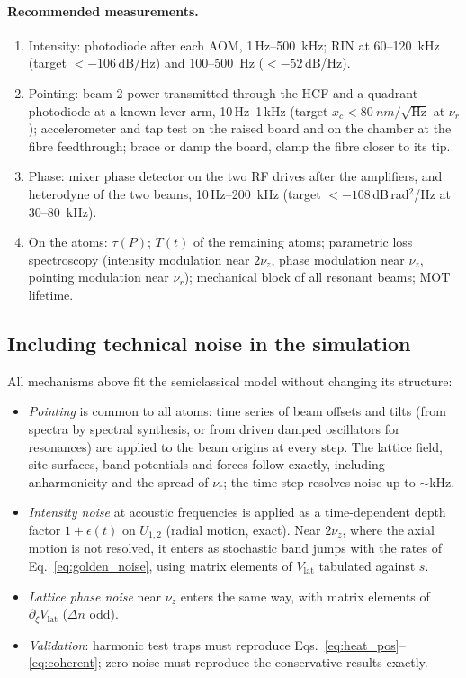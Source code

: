 \documentclass[11pt,a4paper]{article}
\begin{document}
\paragraph{Recommended measurements.}
\begin{enumerate}[leftmargin=*]
\item Intensity: photodiode after each AOM, 1\,Hz--\SI{500}{kHz}; RIN at 60--\SI{120}{kHz} (target $<-106$\,dB/Hz) and 100--\SI{500}{Hz} ($<-52$\,dB/Hz).
\item Pointing: beam-2 power transmitted through the HCF and a quadrant photodiode at a known lever arm, 10\,Hz--1\,kHz (target $x_c<\SI{80}{nm}/\sqrt{\mathrm{Hz}}$ at $\nu_r$); accelerometer and tap test on the raised board and on the chamber at the fibre feedthrough; brace or damp the board, clamp the fibre closer to its tip.
\item Phase: mixer phase detector on the two RF drives after the amplifiers, and heterodyne of the two beams, 10\,Hz--\SI{200}{kHz} (target $<-108$\,dB\,rad$^2$/Hz at 30--\SI{80}{kHz}).
\item On the atoms: $\tau(P)$; $T(t)$ of the remaining atoms; parametric loss spectroscopy (intensity modulation near $2\nu_z$, phase modulation near $\nu_z$, pointing modulation near $\nu_r$); mechanical block of all resonant beams; MOT lifetime.
\end{enumerate}

\subsection{Including technical noise in the simulation}
All mechanisms above fit the semiclassical model without changing its structure:
\begin{itemize}[leftmargin=*]
\item \emph{Pointing} is common to all atoms: time series of beam offsets and tilts (from spectra by spectral synthesis, or from driven damped oscillators for resonances) are applied to the beam origins at every step. The lattice field, site surfaces, band potentials and forces follow exactly, including anharmonicity and the spread of $\nu_r$; the time step resolves noise up to $\sim$kHz.
\item \emph{Intensity noise} at acoustic frequencies is applied as a time-dependent depth factor $1+\epsilon(t)$ on $U_{1,2}$ (radial motion, exact). Near $2\nu_z$, where the axial motion is not resolved, it enters as stochastic band jumps with the rates of Eq.~\eqref{eq:golden_noise}, using matrix elements of $V_\mathrm{lat}$ tabulated against $s$.
\item \emph{Lattice phase noise} near $\nu_z$ enters the same way, with matrix elements of $\partial_\xi V_\mathrm{lat}$ ($\Delta n$ odd).
\item \emph{Validation}: harmonic test traps must reproduce Eqs.~\eqref{eq:heat_pos}--\eqref{eq:coherent}; zero noise must reproduce the conservative results exactly.
\end{itemize}
\end{document}
